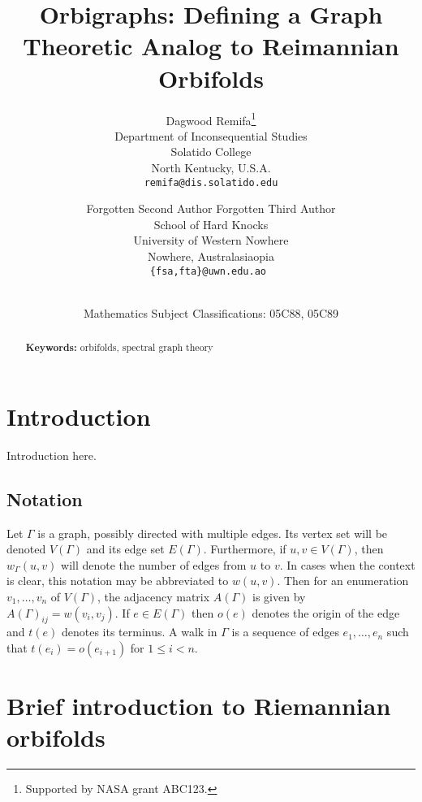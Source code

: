 \documentclass[12pt]{article}
\title{\bf Orbigraphs: Defining a Graph Theoretic Analog to Reimannian Orbifolds}
\author{Dagwood Remifa\thanks{Supported by NASA grant ABC123.}\\
\small Department of Inconsequential Studies\\[-0.8ex]
\small Solatido College\\[-0.8ex] 
\small North Kentucky, U.S.A.\\
\small\tt remifa@dis.solatido.edu\\
\and
Forgotten Second Author \qquad  Forgotten Third Author\\
\small School of Hard Knocks\\[-0.8ex]
\small University of Western Nowhere\\[-0.8ex]
\small Nowhere, Australasiaopia\\
\small\tt \{fsa,fta\}@uwn.edu.ao
}
\date{\dateline{Jan 1, 2012}{Jan 2, 2012}\\
\small Mathematics Subject Classifications: 05C88, 05C89}
\theoremstyle{plain}
\theoremstyle{definition}
\theoremstyle{remark}
\begin{document}
\maketitle


\begin{abstract}
  \bigskip\noindent \textbf{Keywords:} orbifolds, spectral graph theory
\end{abstract}


\section{Introduction}

  Introduction here.
  

  \subsection{Notation}
  Let $\Gamma$ is a graph, possibly directed with multiple edges. Its vertex set will be denoted $V(\Gamma)$ and its edge set $E(\Gamma)$. Furthermore, if $u, v \in V(\Gamma)$, then $w_\Gamma(u, v)$ will denote the number of edges from $u$ to $v$. In cases when the context is clear, this notation may be abbreviated to $w(u,v)$. Then for an enumeration $v_1, \ldots, v_n$ of $V(\Gamma)$, the adjacency matrix $A(\Gamma)$ is given by $A(\Gamma)_{ij} = w(v_i, v_j)$. If $e \in E(\Gamma)$ then $o(e)$ denotes the origin of the edge and $t(e)$ denotes its terminus. A walk in $\Gamma$ is a sequence of edges $e_1,\ldots,e_n$ such that $t(e_i) = o(e_{i+1})$ for $1 \le i < n$.


\section{Brief introduction to Riemannian orbifolds}
\end{document}
